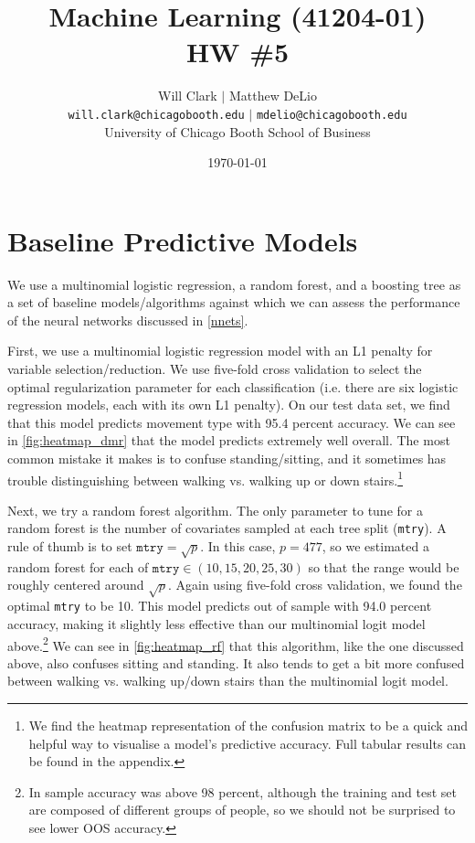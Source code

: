 



\title{Machine Learning (41204-01)\\HW \#5}
\author{Will Clark $\vert$ Matthew DeLio \\
\texttt{will.clark@chicagobooth.edu} $\vert$ \texttt{mdelio@chicagobooth.edu} \\
University of Chicago Booth School of Business}
\date{\today}
\maketitle

\section{Baseline Predictive Models} \label{baseline}

We use a multinomial logistic regression, a random forest, and a boosting tree as a set of baseline models/algorithms against which we can assess the performance of the neural networks discussed in \cref{nnets}. 

First, we use a multinomial logistic regression model with an L1 penalty for variable selection/reduction. We use five-fold cross validation to select the optimal regularization parameter for each classification (i.e. there are six logistic regression models, each with its own L1 penalty). On our test data set, we find that this model predicts movement type with 95.4 percent accuracy. We can see in \cref{fig:heatmap_dmr} that the model predicts extremely well overall. The most common mistake it makes is to confuse standing/sitting, and it sometimes has trouble distinguishing between walking vs. walking up or down stairs.\footnote{We find the heatmap representation of the confusion matrix to be a quick and helpful way to visualise a model's predictive accuracy. Full tabular results can be found in the appendix.}

Next, we try a random forest algorithm. The only parameter to tune for a random forest is the number of covariates sampled at each tree split (\texttt{mtry}). A rule of thumb is to set $\texttt{mtry}=\sqrt{p}$. In this case, $p=477$, so we estimated a random forest for each of $\texttt{mtry}\in(10, 15, 20, 25, 30)$ so that the range would be roughly centered around $\sqrt{p}$. Again using five-fold cross validation, we found the optimal \texttt{mtry} to be 10. This model predicts out of sample with 94.0 percent accuracy, making it slightly less effective than our multinomial logit model above.\footnote{In sample accuracy was above 98 percent, although the training and test set are composed of different groups of people, so we should not be surprised to see lower OOS accuracy.} We can see in \cref{fig:heatmap_rf} that this algorithm, like the one discussed above, also confuses sitting and standing. It also tends to get a bit more confused between walking vs. walking up/down stairs than the multinomial logit model.

